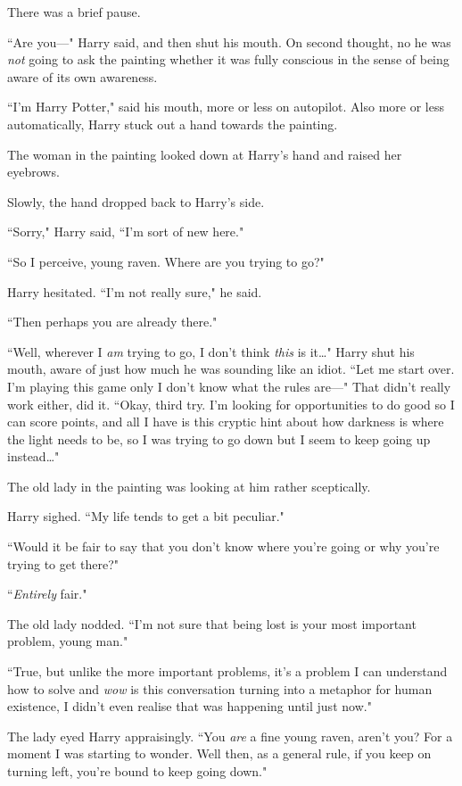 There was a brief pause.

``Are you—" Harry said, and then shut his mouth. On second thought, no he was \emph{not} going to ask the painting whether it was fully conscious in the sense of being aware of its own awareness.

``I'm Harry Potter," said his mouth, more or less on autopilot. Also more or less automatically, Harry stuck out a hand towards the painting.

The woman in the painting looked down at Harry's hand and raised her eyebrows.

Slowly, the hand dropped back to Harry's side.

``Sorry," Harry said, ``I'm sort of new here."

``So I perceive, young raven. Where are you trying to go?"

Harry hesitated. ``I'm not really sure," he said.

``Then perhaps you are already there."

``Well, wherever I \emph{am} trying to go, I don't think \emph{this} is it…" Harry shut his mouth, aware of just how much he was sounding like an idiot. ``Let me start over. I'm playing this game only I don't know what the rules are—" That didn't really work either, did it. ``Okay, third try. I'm looking for opportunities to do good so I can score points, and all I have is this cryptic hint about how darkness is where the light needs to be, so I was trying to go down but I seem to keep going up instead…"

The old lady in the painting was looking at him rather sceptically.

Harry sighed. ``My life tends to get a bit peculiar."

``Would it be fair to say that you don't know where you're going or why you're trying to get there?"

``\emph{Entirely} fair."

The old lady nodded. ``I'm not sure that being lost is your most important problem, young man."

``True, but unlike the more important problems, it's a problem I can understand how to solve and \emph{wow} is this conversation turning into a metaphor for human existence, I didn't even realise that was happening until just now."

The lady eyed Harry appraisingly. ``You \emph{are} a fine young raven, aren't you? For a moment I was starting to wonder. Well then, as a general rule, if you keep on turning left, you're bound to keep going down."

